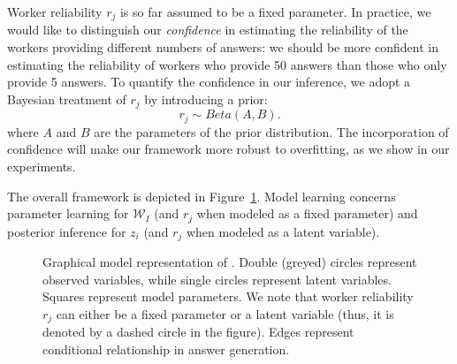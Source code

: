 Worker reliability $r_j$ is so far assumed to be a fixed parameter. In practice, we would like to distinguish our \emph{confidence} in estimating the reliability of the workers providing different numbers of answers: we should be more confident in estimating the reliability of workers who provide 50 answers than those who only provide 5 answers. To quantify the confidence in our inference, we adopt a Bayesian treatment of $r_j$ by introducing a prior:
%
\begin{equation}
        r_j \sim Beta(A,B).
        \label{eq:rj_dist}
\end{equation}
%
where $A$ and $B$ are the parameters of the prior distribution. The incorporation of confidence will make our framework more robust to overfitting, as we show in our experiments. 

The overall \sys framework is depicted in Figure~\ref{fig:graphical_model}. Model learning concerns parameter learning for $\mathcal{W}_I$ (and $r_j$ when modeled as a fixed parameter) and posterior inference for $z_i$ (and $r_j$ when modeled as a latent variable).  

\begin{figure}[htb] 
{
}
\caption{Graphical model representation of \sys. Double (greyed) circles represent observed variables, while single circles represent latent variables.  Squares represent model parameters. We note that worker reliability $r_j$ can either be a fixed parameter or a latent variable (thus, it is denoted by a dashed circle in the figure). Edges represent conditional relationship in answer generation.}
\label{fig:graphical_model}
\end{figure}


